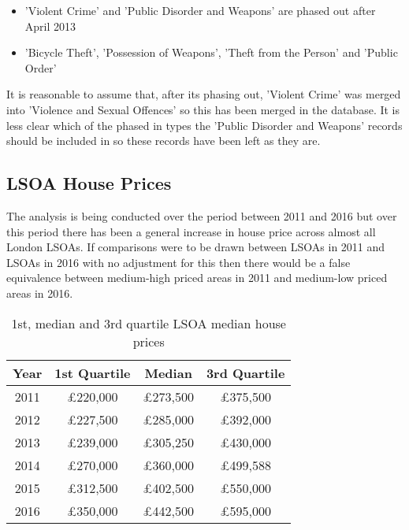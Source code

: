 \documentclass{article}
\begin{document}
\begin{itemize}
\item 'Violent Crime' and 'Public Disorder and Weapons' are phased out after April 2013
\item 'Bicycle Theft', 'Possession of Weapons', 'Theft from the Person' and 'Public Order' 
\end{itemize}
\smallskip
It is reasonable to assume that, after its phasing out, 'Violent Crime' was merged into 'Violence and Sexual Offences' so this has been merged in the database. It is less clear which of the phased in types the 'Public Disorder and Weapons' records should be included in so these records have been left as they are.

\subsection{LSOA House Prices}

The analysis is being conducted over the period between 2011 and 2016 but over this period there has been a general increase in house price across almost all London LSOAs. If comparisons were to be drawn between LSOAs in 2011 and LSOAs in 2016 with no adjustment for this then there would be a false equivalence between medium-high priced areas in 2011 and medium-low priced areas in 2016.

\begin{table}[H]
  \begin{center}
    \caption{1st, median and 3rd quartile LSOA median house prices}
    \label{tab:table1}
    \begin{tabular}{|c|c c c|}
    \hline
      \textbf{Year} & \textbf{1st Quartile} & \textbf{Median} & \textbf{3rd Quartile} \\
      \hline
      2011 &  \pounds 220,000 & \pounds 273,500 & \pounds 375,500 \\ 
  	  \hline
  	  2012 & \pounds 227,500 & \pounds 285,000 & \pounds 392,000 \\
  	  \hline
  	  2013 & \pounds 239,000 & \pounds 305,250 & \pounds 430,000 \\
  	  \hline
  	  2014 & \pounds 270,000 & \pounds 360,000 & \pounds 499,588 \\
  	  \hline
  	  2015 & \pounds 312,500 & \pounds 402,500 & \pounds 550,000 \\
  	  \hline
  	  2016 & \pounds 350,000 & \pounds 442,500 & \pounds 595,000 \\
      \hline
    \end{tabular}
  \end{center}
\end{table}
\end{document}
